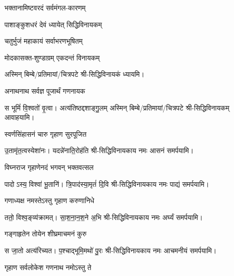 \begin{center}

{भक्तानामिष्टवरदं सर्वमंगल-कारणम्}

{पाशाङ्कुशधरं देवं ध्यायेत् सिद्धिविनायकम्}

{चतुर्भुजं महाकायं सर्वाभरणभूषितम्}

{मोदकासक्त-शुण्डाग्रम् एकदन्तं विनायकम्}

अस्मिन् बिम्बे/प्रतिमायां/चित्रपटे श्री-सिद्धिविनायकं ध्यायमि।

{अनाथनाथ सर्वज्ञ पूजार्थं गणनायक}

{स भूमिं॑ वि॒श्वतो॑ वृ॒त्वा। अत्य॑तिष्ठद्दशाङ्गु॒लम्}
अस्मिन् बिम्बे/प्रतिमायां/चित्रपटे श्री-सिद्धिविनायकम् आवाहयामि।
\medskip

{स्वर्णसिंहासनं चारु गृहाण सुरपूजित}

{उ॒तामृ॑त॒त्वस्येशा॑नः। यदन्ने॑नाति॒रोह॑ति}
श्री-सिद्धिविनायकाय नमः आसनं समर्पयामि।\medskip

{विघ्नराज गृहाणेनदं भगवन् भक्तवत्सल}

{पादोऽस्य॒ विश्वा॑ भू॒तानि॑। त्रि॒पाद॑स्या॒मृतं॑ दि॒वि}
श्री-सिद्धिविनायकाय नमः पाद्यं समर्पयामि।\medskip

{गणाध्यक्ष नमस्तेऽस्तु गृहाण करुणानिधे}

{ततो॒ विश्व॒ङ्व्य॑क्रामत्। सा॒श॒ना॒न॒श॒ने अ॒भि}
श्री-सिद्धिविनायकाय नमः अर्घ्यं समर्पयामि।\medskip

{गङ्गाहृतेन तोयेन शीघ्रमाचमनं कुरु}

{स जा॒तो अत्य॑रिच्यत। प॒श्चाद्भूमि॒मथो॑ पु॒रः}
श्री-सिद्धिविनायकाय नमः आचमनीयं समर्पयामि।\medskip

{गृहाण सर्वलोकेश गणनाथ नमोऽस्तु ते}


\end{center}
